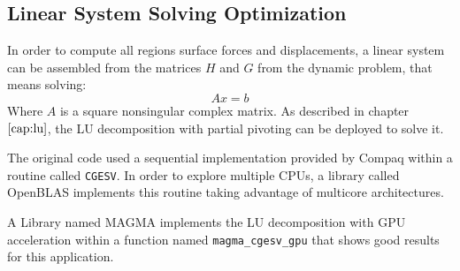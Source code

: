 \subsection{Linear System Solving Optimization}
In order to compute all regions surface forces and displacements, a linear system can be assembled 
from the matrices $H$ and $G$ from the dynamic problem, that means solving: 
\begin{equation}
	Ax = b
\end{equation}
Where $A$ is a square nonsingular complex matrix. As described in chapter $\ref{cap:lu}$, 
the LU decomposition with partial pivoting can be deployed to solve it.

The original code used a sequential implementation provided by Compaq within a routine called \texttt{CGESV}. In order to explore multiple CPUs,
a library called OpenBLAS implements this routine taking advantage of multicore architectures.  

A Library named MAGMA implements the LU decomposition with GPU acceleration within a function named \texttt{magma\_cgesv\_gpu} that shows good results for this application.

